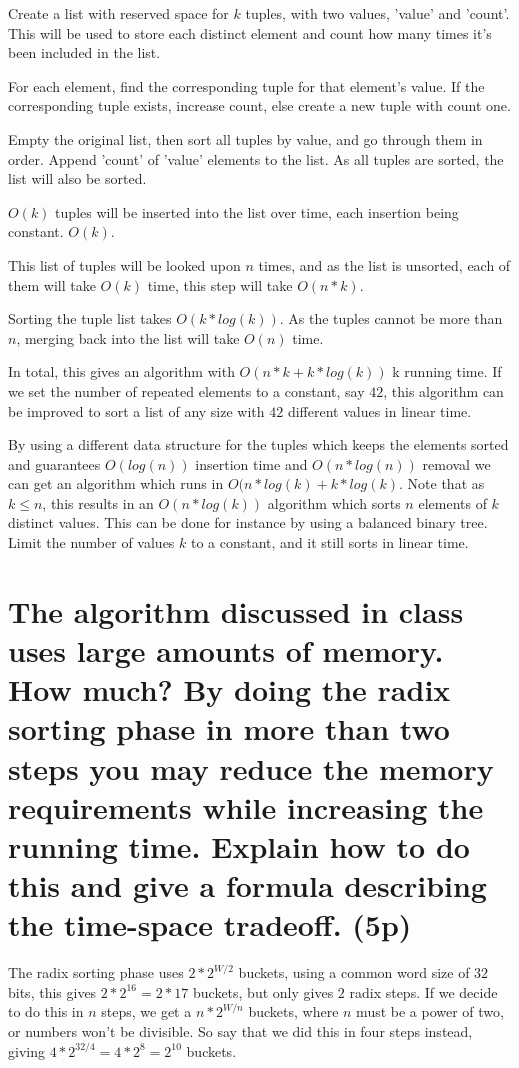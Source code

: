 \documentclass[a4paper,10pt,titlepage]{article}
\begin{document}
Create a list with reserved space for $k$ tuples, with two values, 'value' and 'count'. This will be used to store each distinct element and count how many times it's been included in the list.

For each element, find the corresponding tuple for that element's value. If the corresponding tuple exists, increase count, else create a new tuple with count one.

Empty the original list, then sort all tuples by value, and go through them in order. Append 'count' of 'value' elements to the list. As all tuples are sorted, the list will also be sorted.

$O(k)$ tuples will be inserted into the list over time, each insertion being constant. $O(k)$.

This list of tuples will be looked upon $n$ times, and as the list is unsorted, each of them will take $O(k)$ time, this step will take $O(n*k)$.

Sorting the tuple list takes $O(k*log(k))$. As the tuples cannot be more than $n$, merging back into the list will take $O(n)$ time.

In total, this gives an algorithm with $O(n*k + k*log(k))$ k running time. If we set the number of repeated elements to a constant, say $42$, this algorithm can be improved to sort a list of any size with $42$ different values in linear time.

By using a different data structure for the tuples which keeps the elements sorted and guarantees $O(log(n))$ insertion time and $O(n*log(n))$ removal we can get an algorithm which runs in $O(n*log(k) + k*log(k)$. Note that as $k \leq n$, this results in an $O(n*log(k))$ algorithm which sorts $n$ elements of $k$ distinct values. This can be done for instance by using a balanced binary tree. Limit the number of values $k$ to a constant, and it still sorts in linear time.

\section {The algorithm discussed in class uses large amounts of memory. How much? By doing the radix sorting phase in more than two steps you may reduce the memory requirements while increasing the running time. Explain how to do this and give a formula describing the time-space tradeoff. (5p)}

The radix sorting phase uses $2*2^{W/2}$ buckets, using a common word size of $32$ bits, this gives $2*2^{16} = 2*17$ buckets, but only gives $2$ radix steps. If we decide to do this in $n$ steps, we get a $n*2^{W/n}$ buckets, where $n$ must be a power of two, or numbers won't be divisible. So say that we did this in four steps instead, giving $4*2^{32/4} = 4*2^{8} = 2^{10}$ buckets. 
\end{document}

